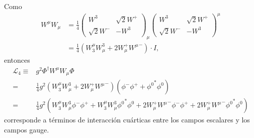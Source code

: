 Como
\begin{align}
  W^\mu W_\mu&=
  \frac{1}{4} \begin{pmatrix}
    W^3&\sqrt{2}W^+\\
    \sqrt{2}W^-&-W^3
  \end{pmatrix}_\mu
\begin{pmatrix}
    W^3&\sqrt{2}W^+\\
    \sqrt{2}W^-&-W^3
  \end{pmatrix}^\mu\nonumber\\
  &=\tfrac{1}{4}\left(W_3^\mu W^3_\mu+2W_\mu^+{W^\mu}^-\right)\cdot I,
\end{align}
entonces
\begin{align}
\mathcal{L}_4\equiv& g^2 \Phi^\dagger W^\mu W_\mu\Phi\nonumber\\
=&\tfrac{1}{4}g^2\left(W_3^\mu W^3_\mu+2W_\mu^+{W^\mu}^-\right)\left(\phi^-\phi^+ +{\phi^0}^*\phi^0\right)\nonumber\\
\label{eq:75}
=&\tfrac{1}{4}g^2\left(W_3^\mu W^3_\mu\phi^-\phi^+ +W_3^\mu W^3_\mu{\phi^0}^*\phi^0+2W_\mu^+{W^\mu}^- \phi^-\phi^+ +2W_\mu^+{W^\mu}^-{\phi^0}^*\phi^0\right)
\end{align}
corresponde a t\'erminos de interacci\'on cu\'articas entre los campos escalares y los campos gauge.


